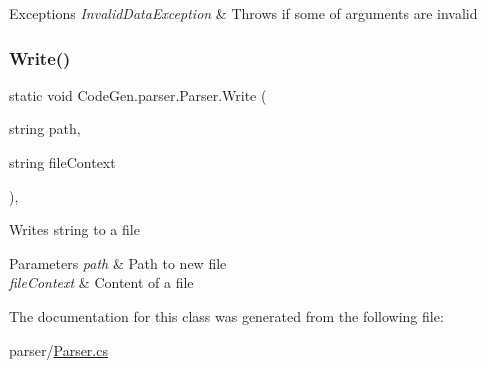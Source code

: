\begin{DoxyExceptions}{Exceptions}
{\em Invalid\+Data\+Exception} & Throws if some of arguments are invalid\\
\hline
\end{DoxyExceptions}
\mbox{\label{classCodeGen_1_1parser_1_1Parser_a1d09a5fa154036958d654c65d3e64d7b}} 
\subsubsection{\texorpdfstring{Write()}{Write()}}
{\footnotesize\ttfamily static void Code\+Gen.\+parser.\+Parser.\+Write (\begin{DoxyParamCaption}\item[{string}]{path,  }\item[{string}]{file\+Context }\end{DoxyParamCaption})\hspace{0.3cm}{\ttfamily [inline]}, {\ttfamily [static]}}



Writes string to a file 


\begin{DoxyParams}{Parameters}
{\em path} & Path to new file\\
\hline
{\em file\+Context} & Content of a file\\
\hline
\end{DoxyParams}


The documentation for this class was generated from the following file\+:\begin{DoxyCompactItemize}
\item 
parser/\mbox{\hyperlink{Parser_8cs}{Parser.\+cs}}\end{DoxyCompactItemize}
